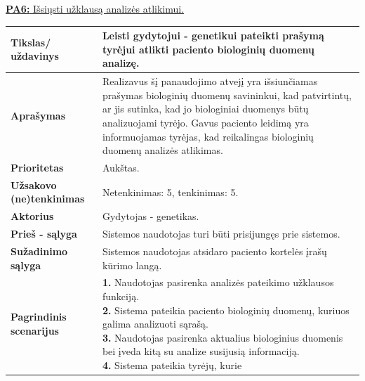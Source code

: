 \documentclass[12pt]{article}
\begin{document}
\noindent \hypertarget{FR6}{\hyperlink{PA6}{\textbf{PA6:} Išsiųsti užklausą
analizės atlikimui.}}
\label{sec:FR6}
\begin{table}[htb!]
    \captionsetup{justification=centering}
    \begin{tabular}{|m{3cm}|m{13.7cm}|}
        \hline
        \raggedleft \textbf{\cellcolor{deepchampagne}Tikslas/ uždavinys} &
        Leisti gydytojui - genetikui pateikti prašymą tyrėjui atlikti paciento
        biologinių duomenų analizę. \\
        \hline
        \raggedleft \textbf{\cellcolor{deepchampagne}Aprašymas} &
        Realizavus šį panaudojimo atvejį yra išsiunčiamas prašymas biologinių
        duomenų savininkui, kad patvirtintų, ar jis sutinka, kad jo
        biologiniai duomenys būtų analizuojami tyrėjo. Gavus paciento leidimą
        yra informuojamas tyrėjas, kad reikalingas biologinių duomenų analizės
        atlikimas. \\
        \hline
        \raggedleft \textbf{\cellcolor{deepchampagne}Prioritetas} & Aukštas. \\
        \hline
        \raggedleft \textbf{\cellcolor{deepchampagne}Užsakovo (ne)tenkinimas} &
        Netenkinimas: 5, tenkinimas: 5. \\
        \hline
        \raggedleft \textbf{\cellcolor{deepchampagne}Aktorius} &
        Gydytojas - genetikas. \\
        \hline
        \raggedleft \textbf{\cellcolor{deepchampagne}Prieš - sąlyga} &
        Sistemos naudotojas turi būti prisijungęs prie sistemos. \\
        \hline
        \raggedleft \textbf{\cellcolor{deepchampagne}Sužadinimo sąlyga} &
        Sistemos naudotojas atsidaro paciento kortelės įrašų kūrimo langą. \\
        \hline
        \raggedleft \textbf{\cellcolor{deepchampagne}Pagrindinis
        scenarijus} & \vskip 5pt
        \makecell[l]{\parbox[t]{13.7cm}{
            \textbf{1.} \textcolor{dartmouthgreen}{Naudotojas pasirenka analizės
            pateikimo užklausos funkciją.} \\
            \textbf{2.} {Sistema pateikia paciento
            biologinių duomenų, kuriuos galima analizuoti sąrašą.} \\
            \textbf{3.} \textcolor{dartmouthgreen}{Naudotojas pasirenka
            aktualius biologinius duomenis bei įveda kitą su analize susijusią
            informaciją.} \\
            \textbf{4.} {Sistema pateikia tyrėjų, kurie
}}}
\end{tabular}
\end{table}
\end{document}
